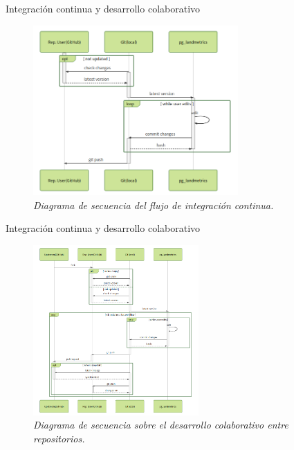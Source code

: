 
\begin{frame}{Integración continua y desarrollo colaborativo}
\begin{figure}
\includegraphics[height=6.5cm]{Metodologia/Figs/diary}
\vspace{-0.5cm}
\caption{\textit{Diagrama de secuencia del flujo de integración continua.}}
\end{figure}
\end{frame}


\begin{frame}{Integración continua y desarrollo colaborativo}
\begin{figure}
\includegraphics[height=6.5cm]{Metodologia/Figs/pullrequest}
\vspace{-0.5cm}
\caption{\textit{Diagrama de secuencia sobre el desarrollo colaborativo entre repositorios.}}
\end{figure}
\end{frame}


